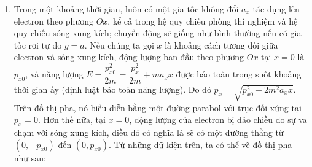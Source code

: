 \begin{loigiai}
\begin{enumerate}[1)]
    \item Trong một khoảng thời gian, luôn có một gia tốc không đổi $a_{x}$ tác dụng lên electron theo phương $Ox$, kể cả trong hệ quy chiếu phòng thí nghiệm và hệ quy chiếu sóng xung kích; chuyển động sẽ giống như bình thường nếu có gia tốc rơi tự do $g=a$. Nếu chúng ta gọi $x$ là khoảng cách tương đối giữa electron và sóng xung kích, động lượng ban đầu theo phương $Ox$ tại $x=0$ là $p_{x0}$, và năng lượng $E=\dfrac{p_{x0}^2}{2m}=\dfrac{p^2_{x}}{2m}+ma_{x}x$ được bảo toàn trong suốt khoảng thời gian ấy (định luật bảo toàn năng lượng). Do đó $p_{x}=\sqrt{p^2_{x0}-2m^2a_{x}x}$. Trên đồ thị pha, nó biểu diễn bằng một đường parabol với trục đối xứng tại $p_{x}=0$. Hơn thế nữa, tại $x=0$, động lượng của electron bị đảo chiều do sự va chạm với sóng xung kích, điều đó có nghĩa là sẽ có một đường thẳng từ $(0,-p_{x0})$ đến $(0,p_{x0})$. Từ những dữ kiện trên, ta có thể vẽ đồ thị pha như sau:
    \begin{center}
 
\tikzset{
pattern size/.store in=\mcSize, 
pattern size = 5pt,
pattern thickness/.store in=\mcThickness, 
pattern thickness = 0.3pt,
pattern radius/.store in=\mcRadius, 
pattern radius = 1pt}
\makeatletter
{}
\makeatother
{} %

\begin{tikzpicture}[x=0.75pt,y=0.75pt,yscale=-1,xscale=1]


\end{tikzpicture}
\end{center}
\end{enumerate}
\end{loigiai}
